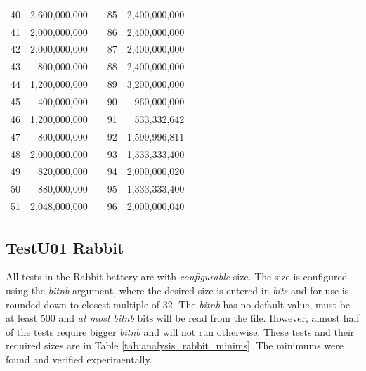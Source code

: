 \documentclass[
  digital,     %
  oneside,     %
  nosansbold,  %
  nocolorbold, %
  nolof,         %
  nolot,         %
]{fithesis4}
\begin{document}
\begin{longtable}[c]{l|rcl|r}
40 & 2,600,000,000 &  & 85 & 2,400,000,000\\
41 & 2,000,000,000 &  & 86 & 2,400,000,000\\
42 & 2,000,000,000 &  & 87 & 2,400,000,000\\
43 & 800,000,000 &  & 88 & 2,400,000,000\\
44 & 1,200,000,000 &  & 89 & 3,200,000,000\\
45 & 400,000,000 &  & 90 & 960,000,000\\
46 & 1,200,000,000 &  & 91 & 533,332,642\\
47 & 800,000,000 &  & 92 & 1,599,996,811\\
48 & 2,000,000,000 &  & 93 & 1,333,333,400\\
49 & 820,000,000 &  & 94 & 2,000,000,020\\
50 & 880,000,000 &  & 95 & 1,333,333,400\\
51 & 2,048,000,000 &  & 96 & 2,000,000,040\\

 \end{longtable}




\subsection{TestU01 Rabbit} \label{chap:analysis-data-rabbit}
All tests in the Rabbit battery are with \emph{configurable} size. The size is configured using the \emph{bit\textunderscore nb} argument, where the desired size is entered in \emph{bits} and for use is rounded down to closest multiple of 32. The \emph{bit\textunderscore nb} has no default value, must be at least 500 and \emph{at most} \emph{bit\textunderscore nb} bits will be read from the file. \cite[p. 152]{tu01_guide} However, almost half of the tests require bigger \emph{bit\textunderscore nb} and will not run otherwise. These tests and their required sizes are in Table \ref{tab:analysis_rabbit_minims}. The minimums were found and verified experimentally.
\end{document}
